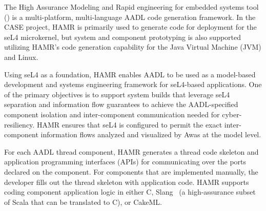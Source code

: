 
The High Assurance Modeling and
Rapid engineering for embedded systems tool (\hamr)
\cite{hamr} is a multi-platform, multi-language
AADL code generation framework.  In the CASE project, HAMR is primarily used
to generate code for deployment for the seL4 microkernel, but system and component
prototyping is also supported utilizing HAMR's code generation capability
for the Java Virtual Machine (JVM) and Linux.  

Using seL4 as a foundation, HAMR enables
AADL to be used as a model-based development and systems
engineering framework for seL4-based applications.
One of the primary objectives is to support system builds that
leverage seL4 separation and information flow
guarantees to achieve the AADL-specified component isolation and
inter-component communication needed for cyber-resiliency.
HAMR ensures that seL4 is configured to permit the exact
inter-component information flows analyzed and visualized by Awas at
the model level.

For each AADL thread component, HAMR generates a thread code
skeleton and application programming interfaces (APIs) for communicating over the ports declared on
the component.  For components that are implemented manually, the
developer fills out the thread skeleton with application code.
HAMR supports coding component application logic in either C,
Slang~\cite{slang} (a high-assurance subset of Scala that can be translated to
C), or CakeML. 

